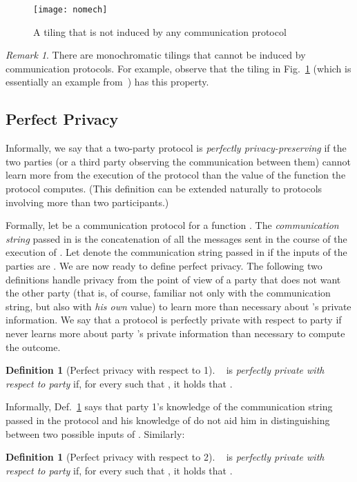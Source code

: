 \documentclass{article}
\theoremstyle{theorem}
\theoremstyle{definition}
\newtheorem{definition}[theorem]{Definition}
\theoremstyle{remark}
\newtheorem{remark}[theorem]{Remark}
\begin{document}
\begin{figure}[htp]
\begin{center}
\texttt{[image: nomech]}
\caption{\small A tiling that is not induced by any communication
protocol~\cite{K92}}\label{fig:nomech}
\end{center}
\end{figure}

\begin{remark}
There are monochromatic tilings that cannot be induced by communication
protocols. For example, observe that the tiling in
Fig.~\ref{fig:nomech} (which is essentially an example from~\cite{K92}) has this property.
\end{remark}


\subsection{Perfect Privacy}\label{subsec_perfect-privacy}

Informally, we say that a two-party protocol is \emph{perfectly
privacy-preserving} if the two parties (or a third party observing
the communication between them) cannot learn more from the execution
of the protocol than the value of the function the protocol
computes.  (This definition can be extended naturally to protocols
involving more than two participants.)

Formally, let  be a communication protocol for a function .
The \emph{communication string} passed in  is the concatenation
of all the messages  sent in the course of the
execution of . Let  denote the communication
string passed in  if the inputs of the parties are .
We are now ready to define perfect privacy. The following two
definitions handle privacy from the point of view of a party 
that does not want the other party (that is, of course, familiar not
only with the communication string, but also with \emph{his own}
value) to learn more than necessary about 's private information.
We say that a protocol is perfectly private with respect to party
 if  never learns more about party 's private information
than necessary to compute the outcome.

\begin{definition} [Perfect privacy with respect to 1]~\cite{CK91,K92} \label{def_ppwrt1}
 is \emph{perfectly private with respect to party } if, for
every  such that , it holds that
.
\end{definition}

Informally, Def.~\ref{def_ppwrt1} says that party 1's knowledge of the communication
string passed in the protocol and his knowledge of  do not
aid him in distinguishing between two possible inputs of .
Similarly:
\begin{definition}[Perfect privacy with respect to 2]~\cite{CK91,K92}
 is \emph{perfectly private with respect to party } if, for
every  such that , it holds that
.
\end{definition}
\end{document}
